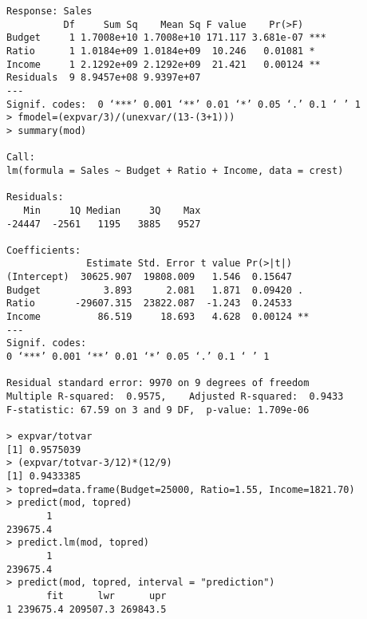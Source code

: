 \documentclass[letterpaper,10pt]{article}
\begin{document}
\begin{enumerate}
\begin{verbatim}
Response: Sales
          Df     Sum Sq    Mean Sq F value    Pr(>F)    
Budget     1 1.7008e+10 1.7008e+10 171.117 3.681e-07 ***
Ratio      1 1.0184e+09 1.0184e+09  10.246   0.01081 *  
Income     1 2.1292e+09 2.1292e+09  21.421   0.00124 ** 
Residuals  9 8.9457e+08 9.9397e+07                      
---
Signif. codes:  0 ‘***’ 0.001 ‘**’ 0.01 ‘*’ 0.05 ‘.’ 0.1 ‘ ’ 1
> fmodel=(expvar/3)/(unexvar/(13-(3+1)))
> summary(mod)

Call:
lm(formula = Sales ~ Budget + Ratio + Income, data = crest)

Residuals:
   Min     1Q Median     3Q    Max 
-24447  -2561   1195   3885   9527 

Coefficients:
              Estimate Std. Error t value Pr(>|t|)   
(Intercept)  30625.907  19808.009   1.546  0.15647   
Budget           3.893      2.081   1.871  0.09420 . 
Ratio       -29607.315  23822.087  -1.243  0.24533   
Income          86.519     18.693   4.628  0.00124 **
---
Signif. codes:  
0 ‘***’ 0.001 ‘**’ 0.01 ‘*’ 0.05 ‘.’ 0.1 ‘ ’ 1

Residual standard error: 9970 on 9 degrees of freedom
Multiple R-squared:  0.9575,	Adjusted R-squared:  0.9433 
F-statistic: 67.59 on 3 and 9 DF,  p-value: 1.709e-06

> expvar/totvar
[1] 0.9575039
> (expvar/totvar-3/12)*(12/9)
[1] 0.9433385
> topred=data.frame(Budget=25000, Ratio=1.55, Income=1821.70)
> predict(mod, topred)
       1 
239675.4 
> predict.lm(mod, topred)
       1 
239675.4 
> predict(mod, topred, interval = "prediction")
       fit      lwr      upr
1 239675.4 209507.3 269843.5
\end{verbatim}
\end{enumerate}
\end{document}
